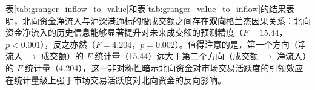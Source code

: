 \documentclass{article}
\begin{document}
\begin{table}[htbp]
    \centering
    \caption{格兰杰因果检验：沪深港通标的股成交额对北向资金净流入的预测效应}
    \label{tab:granger_value_to_inflow}
\end{table}

表\ref{tab:granger_inflow_to_value}和表\ref{tab:granger_value_to_inflow}的结果表明，北向资金净流入与沪深港通标的股成交额之间存在\textbf{双向}格兰杰因果关系：北向资金净流入的历史信息能够显著提升对未来成交额的预测精度（$F = 15.44$，$p < 0.001$），反之亦然（$F = 4.204$，$p = 0.002$）。值得注意的是，第一个方向（净流入 $\to$ 成交额）的 $F$ 统计量（15.44）远大于第二个方向（成交额 $\to$ 净流入）的 $F$ 统计量（4.204），这一非对称性暗示北向资金对市场交易活跃度的引领效应在统计量级上强于市场交易活跃度对北向资金的反向影响。
\end{document}
